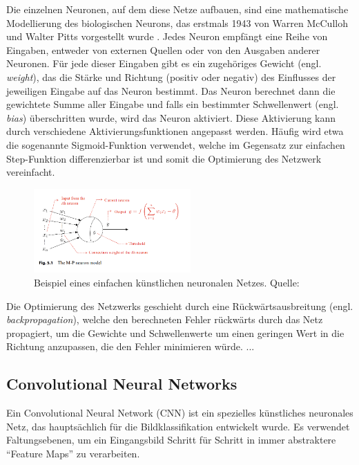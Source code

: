Die einzelnen Neuronen, auf dem diese Netze aufbauen, sind eine mathematische Modellierung des biologischen Neurons, das erstmals 1943 von Warren McCulloh und Walter Pitts vorgestellt wurde \parencite{Zhou2021}. Jedes Neuron empfängt eine Reihe von Eingaben, entweder von externen Quellen oder von den Ausgaben anderer Neuronen. Für jede dieser Eingaben gibt es ein zugehöriges Gewicht (engl. \textit{weight}), das die Stärke und Richtung (positiv oder negativ) des Einflusses der jeweiligen Eingabe auf das Neuron bestimmt. Das Neuron berechnet dann die gewichtete Summe aller Eingabe und falls ein bestimmter Schwellenwert (engl. \textit{bias}) überschritten wurde, wird das Neuron aktiviert. Diese Aktivierung kann durch verschiedene Aktivierungsfunktionen angepasst werden. Häufig wird etwa die sogenannte Sigmoid-Funktion verwendet, welche im Gegensatz zur einfachen Step-Funktion differenzierbar ist und somit die Optimierung des Netzwerk vereinfacht.

\begin{figure}[]
	\centering
	\includegraphics[width=6cm]{figure_neural_network.png}
	\caption{Beispiel eines einfachen künstlichen neuronalen Netzes. Quelle: \parencite{Zhou2021}}
\end{figure}

Die Optimierung des Netzwerks geschieht durch eine Rückwärtsausbreitung (engl. \textit{backpropagation}), welche den berechneten Fehler rückwärts durch das Netz propagiert, um die Gewichte und Schwellenwerte um einen geringen Wert in die Richtung anzupassen, die den Fehler minimieren würde. ...


\subsection{Convolutional Neural Networks} %

Ein Convolutional Neural Network (CNN) ist ein spezielles künstliches neuronales Netz, das hauptsächlich für die Bildklassifikation entwickelt wurde. Es verwendet Faltungsebenen, um ein Eingangsbild Schritt für Schritt in immer abstraktere “Feature Maps” zu verarbeiten.

